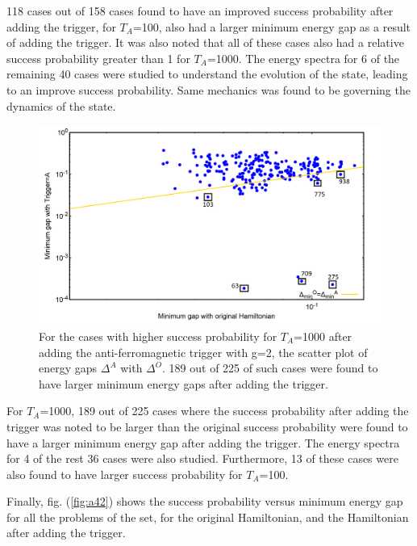 \documentclass[../main.tex]{subfiles}
\begin{document}
118 cases out of 158 cases found to have an improved success probability after adding the trigger, for $T_A$=100, also had a larger minimum energy gap as a result of adding the trigger. It was also noted that all of these cases also had a  relative success probability greater than 1 for $T_A$=1000. The energy spectra for 6 of the remaining 40 cases were studied to understand the evolution of the state, leading to an improve success probability. Same mechanics was found to be governing the dynamics of the state.
\begin{figure}[H]
\centering 
\includegraphics[scale=0.3]{selected_T1000_g2.png}
\caption{For the cases with higher success probability for $T_A$=1000 after adding the anti-ferromagnetic trigger with g=2, the scatter plot of energy gaps $\Delta^A $ with $\Delta^O$. 189 out of 225 of such cases were found to have larger minimum energy gaps after adding the trigger.}
\label{fig:a45}
\end{figure}
For $T_A$=1000, 189 out of 225 cases where the success probability after adding the trigger was noted to be larger than the original success probability were found to have a larger minimum energy gap after adding the trigger. The energy spectra for 4 of the rest 36 cases were also studied. Furthermore, 13 of these cases were also found to have larger success probability for $T_A$=100.


Finally, fig. (\ref{fig:a42}) shows the success probability versus minimum energy gap for all the problems of the set, for the original Hamiltonian, and the Hamiltonian after adding the trigger. 
\end{document}
